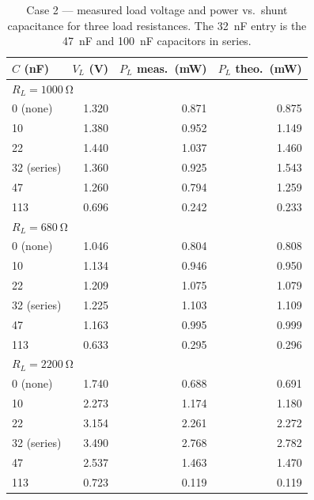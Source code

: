 \documentclass[11pt]{article}
\begin{document}
\begin{table}[H]
    \centering
    \caption{Case 2 --- measured load voltage and power vs.\ shunt capacitance
             for three load resistances. The \SI{32}{\nano\farad} entry is the
             \SI{47}{\nano\farad} and \SI{100}{\nano\farad} capacitors in
             series.}
    \begin{tabular}{lrrr}
        \toprule
        $C$ (nF) & $V_L$ (V) & $P_L$ meas.\ (mW) & $P_L$ theo.\ (mW) \\
        \midrule
        \multicolumn{4}{l}{\textit{$R_L = \SI{1000}{\ohm}$}}\\
        0 (none)     & 1.320 & 0.871 & 0.875 \\
        10           & 1.380 & 0.952 & 1.149 \\
        22           & 1.440 & 1.037 & 1.460 \\
        32 (series)  & 1.360 & 0.925 & 1.543 \\
        47           & 1.260 & 0.794 & 1.259 \\
        113          & 0.696 & 0.242 & 0.233 \\
        \midrule
        \multicolumn{4}{l}{\textit{$R_L = \SI{680}{\ohm}$}}\\
        0 (none)     & 1.046 & 0.804 & 0.808 \\
        10           & 1.134 & 0.946 & 0.950 \\
        22           & 1.209 & 1.075 & 1.079 \\
        32 (series)  & 1.225 & 1.103 & 1.109 \\
        47           & 1.163 & 0.995 & 0.999 \\
        113          & 0.633 & 0.295 & 0.296 \\
        \midrule
        \multicolumn{4}{l}{\textit{$R_L = \SI{2200}{\ohm}$}}\\
        0 (none)     & 1.740 & 0.688 & 0.691 \\
        10           & 2.273 & 1.174 & 1.180 \\
        22           & 3.154 & 2.261 & 2.272 \\
        32 (series)  & 3.490 & 2.768 & 2.782 \\
        47           & 2.537 & 1.463 & 1.470 \\
        113          & 0.723 & 0.119 & 0.119 \\
        \bottomrule
    \end{tabular}
\end{table}
\end{document}
